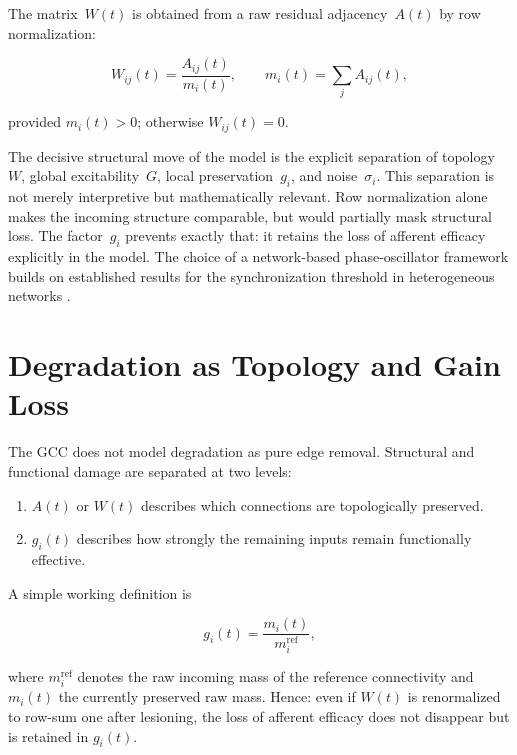 \documentclass[11pt,a4paper]{article}
\theoremstyle{plain}
\theoremstyle{definition}
\theoremstyle{remark}
\begin{document}
The matrix~$W(t)$ is obtained from a raw residual adjacency~$A(t)$ by row normalization:

\begin{equation}
\label{eq:normierung}
W_{ij}(t) = \frac{A_{ij}(t)}{m_i(t)}, \qquad m_i(t) = \sum_j A_{ij}(t),
\end{equation}

provided $m_i(t) > 0$; otherwise $W_{ij}(t) = 0$.

The decisive structural move of the model is the explicit separation of topology~$W$, global excitability~$G$, local preservation~$g_i$, and noise~$\sigma_i$. This separation is not merely interpretive but mathematically relevant. Row normalization alone makes the incoming structure comparable, but would partially mask structural loss. The factor~$g_i$ prevents exactly that: it retains the loss of afferent efficacy explicitly in the model. The choice of a network-based phase-oscillator framework builds on established results for the synchronization threshold in heterogeneous networks \citep{restrepo2005,arenas2008}.


\section{Degradation as Topology and Gain Loss}
\label{sec:abbau}
\label{sec:degradation}

The GCC does not model degradation as pure edge removal. Structural and functional damage are separated at two levels:

\begin{enumerate}
  \item $A(t)$ or $W(t)$ describes which connections are topologically preserved.
  \item $g_i(t)$ describes how strongly the remaining inputs remain functionally effective.
\end{enumerate}

A simple working definition is

\begin{equation}
\label{eq:gain}
g_i(t) = \frac{m_i(t)}{m_i^{\mathrm{ref}}},
\end{equation}

where $m_i^{\mathrm{ref}}$ denotes the raw incoming mass of the reference connectivity and $m_i(t)$ the currently preserved raw mass. Hence: even if $W(t)$ is renormalized to row-sum one after lesioning, the loss of afferent efficacy does not disappear but is retained in $g_i(t)$.
\end{document}
